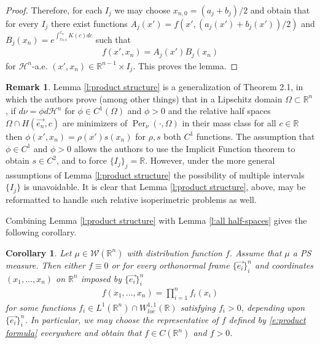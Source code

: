 \documentclass[12pt]{amsart}
\numberwithin{equation}{section}
\theoremstyle{plain}
\newtheorem{corollary}[theorem]{Corollary}
\theoremstyle{definition}
\newtheorem{remark}[theorem]{Remark}
\begin{document}
\begin{proof}
Therefore, for each $I_j$ we may choose $x_{n,0} = (a_j + b_j)/2$ and obtain that for every $I_j$ there exist functions $A_j(x')=f(x',(a_j(x')+b_j(x'))/2)$ and $B_j(x_n)=e^{\int_{x_{n,0}}^{x_n}K(c)dc}$ such that 
\begin{align*}
    f(x', x_n) = A_j(x')B_j(x_n)
\end{align*}
for $\mathcal{H}^n$-a.e. $(x', x_n) \in \mathbb{R}^{n-1} \times I_j$.  This proves the lemma.
\end{proof}

\begin{remark}
    Lemma \ref{l:product structure} is a generalization of \cite{BrockChiacchio16} Theorem 2.1, in which the authors prove (among other things) that in a Lipschitz domain $\Omega\subset \mathbb{R}^n$, if $d\nu = \phi d\mathcal{H}^{n}$ for $\phi \in C^1(\Omega)$ and $\phi>0$ and the relative half spaces $\Omega \cap H(\vec{e_n}, c)$ are minimizers of $\operatorname{Per}_{\nu}(\cdot, \Omega)$ in their mass class for all $c \in \mathbb{R}$ then $\phi(x', x_n) = \rho(x')s(x_n)$ for $\rho, s$ both $C^1$ functions.  The assumption that $\phi \in C^1$ and $\phi>0$ allows the authors to use the Implicit Function theorem to obtain $s \in C^2$, and to force $\{I_j\}_j = \mathbb{R}$.  However, under the more general assumptions of Lemma \ref{l:product structure} the possibility of multiple intervals $\{I_j\}$ is unavoidable. It is clear that Lemma \ref{l:product structure}, above, may be reformatted to handle such relative isoperimetric problems as well.
\end{remark}

Combining Lemma \ref{l:product structure} with Lemma \ref{l:all half-spaces} gives the following corollary.

\begin{corollary}\label{c:product structure in all directions}
Let $\mu \in \mathscr{W}(\mathbb{R}^n)$ with distribution function $f$.  Assume that $\mu$ a PS measure.  Then either $f \equiv 0$ or for every orthonormal frame $\{\vec{e_i} \}_i^n$ and coordinates $(x_1, ..., x_n)$ on $\mathbb{R}^n$ imposed by $\{\vec{e_i}\}_i^n$ \begin{align}\label{e:product formula}
        f(x_1, ..., x_n) = \prod_{i=1}^nf_i(x_i)
    \end{align} for some functions $f_i \in L^1(\mathbb{R}^n) \cap W^{1, 1}_{loc}(\mathbb{R})$ satisfying $f_i>0$, depending upon $\{\vec{e_i} \}_i^n$. In particular, we may choose the representative of $f$ defined by \eqref{e:product formula} everywhere and obtain that $f \in C(\mathbb{R}^n)$ and $f>0$. 
\end{corollary}
\end{document}
